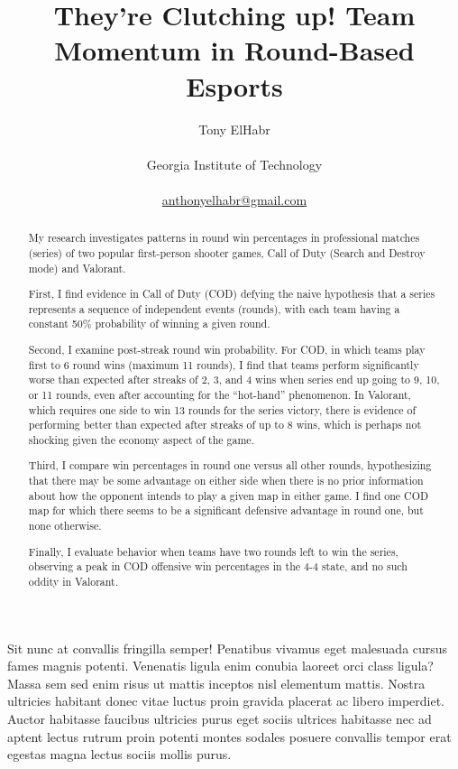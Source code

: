 \documentclass[
]{article}
\title{They're Clutching up! Team Momentum in Round-Based Esports}
\author{
Tony ElHabr\\\\Georgia Institute of
Technology\\\\\href{mailto:anthonyelhabr@gmail.com}{anthonyelhabr@gmail.com}}
\date{}
\begin{document}
\maketitle
\begin{abstract}
My research investigates patterns in round win percentages in
professional matches (series) of two popular first-person shooter games,
Call of Duty (Search and Destroy mode) and Valorant.

First, I find evidence in Call of Duty (COD) defying the naive
hypothesis that a series represents a sequence of independent events
(rounds), with each team having a constant 50\% probability of winning a
given round.

Second, I examine post-streak round win probability. For COD, in which
teams play first to 6 round wins (maximum 11 rounds), I find that teams
perform significantly worse than expected after streaks of 2, 3, and 4
wins when series end up going to 9, 10, or 11 rounds, even after
accounting for the ``hot-hand'' phenomenon. In Valorant, which requires
one side to win 13 rounds for the series victory, there is evidence of
performing better than expected after streaks of up to 8 wins, which is
perhaps not shocking given the economy aspect of the game.

Third, I compare win percentages in round one versus all other rounds,
hypothesizing that there may be some advantage on either side when there
is no prior information about how the opponent intends to play a given
map in either game. I find one COD map for which there seems to be a
significant defensive advantage in round one, but none otherwise.

Finally, I evaluate behavior when teams have two rounds left to win the
series, observing a peak in COD offensive win percentages in the 4-4
state, and no such oddity in Valorant.
\end{abstract}
\ifdefined\Shaded\renewenvironment{Shaded}{\begin{tcolorbox}[boxrule=0pt, sharp corners, enhanced, interior hidden, borderline west={3pt}{0pt}{shadecolor}, breakable, frame hidden]}{\end{tcolorbox}}\fi

Sit nunc at convallis fringilla semper! Penatibus vivamus eget malesuada
cursus fames magnis potenti. Venenatis ligula enim conubia laoreet orci
class ligula? Massa sem sed enim risus ut mattis inceptos nisl elementum
mattis. Nostra ultricies habitant donec vitae luctus proin gravida
placerat ac libero imperdiet. Auctor habitasse faucibus ultricies purus
eget sociis ultrices habitasse nec ad aptent lectus rutrum proin potenti
montes sodales posuere convallis tempor erat egestas magna lectus sociis
mollis purus.
\end{document}
